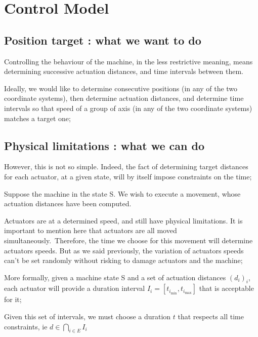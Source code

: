 \newpage

\section{Control Model}


\subsection{Position target : what we want to do}

Controlling the behaviour of the machine, in the less restrictive meaning, means determining successive actuation
distances, and time intervals between them.\newline

Ideally, we would like to determine consecutive positions (in any of the two coordinate systems), then determine
actuation distances, and determine time intervals so that speed of a group of axis (in any of the two coordinate
systems) matches a target one;\newline


\subsection{Physical limitations : what we can do}


However, this is not so simple. Indeed, the fact of determining target distances for each actuator, at a given
state, will by itself impose constraints on the time;\newline

Suppose the machine in the state S. We wish to execute a movement, whose actuation distances have been computed.\newline

Actuators are at a determined speed, and still have physical limitations. It is important to mention here that
actuators are all moved simultaneously.\
    Therefore, the time we choose for this movement will determine actuators speeds. But as we said previously,
the variation of actuators speeds can't be set randomly without risking to damage actuators and the machine;\newline

More formally, given a machine state S and a set of actuation distances $(d_i)_i$, each actuator will provide a
duration interval $I_i = [t_{i_{\min}}, t_{i_{\max}}]$ that is acceptable for it;\newline

Given this set of intervals, we must choose a duration $t$ that respects all time constraints, ie
$d \in \bigcap \limits _{i \in E} I_i$\newline

